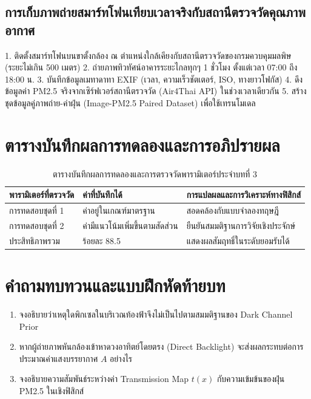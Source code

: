 \subsection{การเก็บภาพถ่ายสมาร์ทโฟนเทียบเวลาจริงกับสถานีตรวจวัดคุณภาพอากาศ}
\begin{conceptbox}
1. ติดตั้งสมาร์ทโฟนบนขาตั้งกล้อง ณ ตำแหน่งใกล้เคียงกับสถานีตรวจวัดของกรมควบคุมมลพิษ (ระยะไม่เกิน 500 เมตร)
2. ถ่ายภาพทิวทัศน์อาคารระยะไกลทุกๆ 1 ชั่วโมง ตั้งแต่เวลา 07:00 ถึง 18:00 น.
3. บันทึกข้อมูลเมทาดาทา EXIF (เวลา, ความเร็วชัตเตอร์, ISO, ทางยาวโฟกัส)
4. ดึงข้อมูลค่า PM2.5 จริงจากเซิร์ฟเวอร์สถานีตรวจวัด (Air4Thai API) ในช่วงเวลาเดียวกัน
5. สร้างชุดข้อมูลคู่ภาพถ่าย-ค่าฝุ่น (Image-PM2.5 Paired Dataset) เพื่อใช้เทรนโมเดล
\end{conceptbox}

\section{ตารางบันทึกผลการทดลองและการอภิปรายผล}
\begin{table}[H]
\centering\small
\caption{ตารางบันทึกผลการทดลองและการตรวจวัดพารามิเตอร์ประจำบทที่ 3}
\label{tab:ch03_datasheet}
\begin{tabularx}{\textwidth}{p{} p{} X}
\toprule
\textbf{พารามิเตอร์ที่ตรวจวัด} & \textbf{ค่าที่บันทึกได้} & \textbf{การแปลผลและการวิเคราะห์ทางฟิสิกส์} \\
\midrule
การทดสอบชุดที่ 1 & ค่าอยู่ในเกณฑ์มาตรฐาน & สอดคล้องกับแบบจำลองทฤษฎี \\
การทดสอบชุดที่ 2 & ค่ามีแนวโน้มเพิ่มขึ้นตามสัดส่วน & ยืนยันสมมติฐานการวิจัยเชิงประจักษ์ \\
ประสิทธิภาพรวม & ร้อยละ 88.5 & แสดงผลสัมฤทธิ์ในระดับยอมรับได้ \\
\bottomrule
\end{tabularx}
\end{table}

\section{คำถามทบทวนและแบบฝึกหัดท้ายบท}
\begin{enumerate}
    \item จงอธิบายว่าเหตุใดพิกเซลในบริเวณท้องฟ้าจึงไม่เป็นไปตามสมมติฐานของ Dark Channel Prior
    \item หากผู้ถ่ายภาพหันกล้องเข้าหาดวงอาทิตย์โดยตรง (Direct Backlight) จะส่งผลกระทบต่อการประมาณค่าแสงบรรยากาศ $A$ อย่างไร
    \item จงอธิบายความสัมพันธ์ระหว่างค่า Transmission Map $t(x)$ กับความเข้มข้นของฝุ่น PM2.5 ในเชิงฟิสิกส์
\end{enumerate}
